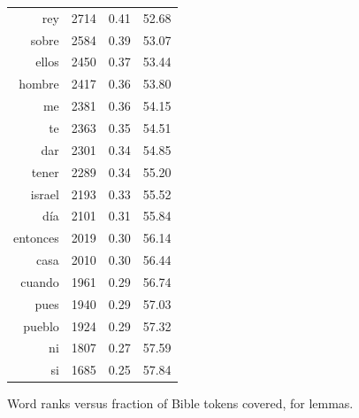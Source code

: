 \begin{figure}
\begin{tiny}
\begin{centering}
\begin{tabular}{|r|c|c|c|}
rey & 2714 & 0.41 & 52.68 \\
sobre & 2584 & 0.39 & 53.07 \\
ellos & 2450 & 0.37 & 53.44 \\
hombre & 2417 & 0.36 & 53.80 \\
me & 2381 & 0.36 & 54.15 \\
te & 2363 & 0.35 & 54.51 \\
dar & 2301 & 0.34 & 54.85 \\
tener & 2289 & 0.34 & 55.20 \\
israel & 2193 & 0.33 & 55.52 \\
día & 2101 & 0.31 & 55.84 \\
entonces & 2019 & 0.30 & 56.14 \\
casa & 2010 & 0.30 & 56.44 \\
cuando & 1961 & 0.29 & 56.74 \\
pues & 1940 & 0.29 & 57.03 \\
pueblo & 1924 & 0.29 & 57.32 \\
ni & 1807 & 0.27 & 57.59 \\
si & 1685 & 0.25 & 57.84 \\
\hline
\end{tabular}
\end{centering}
\end{tiny}
  \caption{Word ranks versus fraction of Bible tokens covered, for lemmas.}
  \label{fig:mostcommon-lemmas}
\end{figure}

